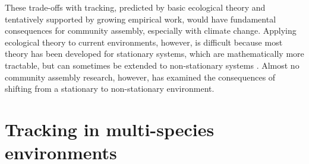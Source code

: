 \documentclass[11pt,letterpaper]{article}
\begin{document}
These trade-offs with tracking, predicted by basic ecological theory and tentatively supported by growing empirical work, would have fundamental consequences for community assembly, especially with climate change. Applying ecological theory to current environments, however, is difficult because most theory has been developed for stationary systems, which are mathematically more tractable, but can sometimes be extended to non-stationary systems \citep{chessonnonstat}. Almost no community assembly research, however, has examined the consequences of shifting from a stationary to non-stationary environment. %




\section{Tracking in multi-species environments}

\end{document}
